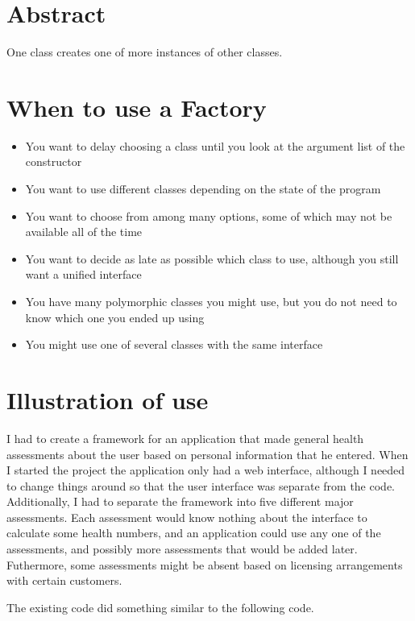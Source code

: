
    \section{Abstract}

One class creates one of more instances of other classes.

    \section{When to use a Factory}
    
\begin{itemize}
\item You want to delay choosing a class until you look at the
    argument list of the constructor
\item You want to use different classes depending on the state
    of the program
\item You want to choose from among many options, some of which
    may not be available all of the time
\item You want to decide as late as possible which class to use,
	although you still want a unified interface
\item You have many polymorphic classes you might use, but you
	do not need to know which one you ended up using
\item You might use one of several classes with the same
	interface
\end{itemize}

\section{Illustration of use}

I had to create a framework for an application that made general
health assessments about the user based on personal information
that he entered.  When I started the project the application only had
a web interface, although I needed to change things around so that
the user interface was separate from the code.  Additionally, I 
had to separate the framework into five different major assessments.
Each assessment would know nothing about the interface to calculate
some health numbers, and an application could use any one of the
assessments, and possibly more assessments that would be added later.
Futhermore, some assessments might be absent based on licensing
arrangements with certain customers.

The existing code did something similar to the following code.

